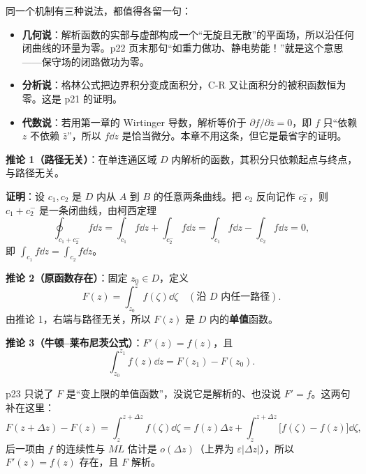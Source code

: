 \documentclass[11pt]{ctexart}
\let\origsubhdr\subhdr
\renewcommand{\subhdr}[1]{\par\needspace{4\baselineskip}\origsubhdr{#1}}
\begin{document}


同一个机制有三种说法，都值得各留一句：

\begin{itemize}
\item \textbf{几何说}：解析函数的实部与虚部构成一个“无旋且无散”的平面场，所以沿任何闭曲线的环量为零。p22 页末那句“如重力做功、静电势能！”就是这个意思——保守场的闭路做功为零。
\item \textbf{分析说}：格林公式把边界积分变成面积分，C-R 又让面积分的被积函数恒为零。这是 p21 的证明。
\item \textbf{代数说}：若用第一章的 Wirtinger 导数，解析等价于 $\partial f/\partial\bar z=0$，即 $f$ 只“依赖 $z$ 不依赖 $\bar z$”，所以 $f\dd z$ 是恰当微分。本章不用这条，但它是最省字的证明。
\end{itemize}


\textbf{推论 1（路径无关）}：在单连通区域 $D$ 内解析的函数，其积分只依赖起点与终点，与路径无关。

\textbf{证明}：设 $c_1,c_2$ 是 $D$ 内从 $A$ 到 $B$ 的任意两条曲线。把 $c_2$ 反向记作 $c_2^{-}$，则 $c_1+c_2^{-}$ 是一条闭曲线，由柯西定理
\[ \oint_{c_1+c_2^{-}}f\dd z=\int_{c_1}f\dd z+\int_{c_2^{-}}f\dd z=\int_{c_1}f\dd z-\int_{c_2}f\dd z=0 , \]
即 $\displaystyle\int_{c_1}f\dd z=\int_{c_2}f\dd z$。

\textbf{推论 2（原函数存在）}：固定 $z_0\in D$，定义
\[ F(z)=\int_{z_0}^{z}f(\zeta)\dd\zeta\quad(\text{沿 }D\text{ 内任一路径}) . \]
由推论 1，右端与路径无关，所以 $F(z)$ 是 $D$ 内的\textbf{单值}函数。

\textbf{推论 3（牛顿--莱布尼茨公式）}：$F'(z)=f(z)$，且
\begin{equation}\label{eq:NL}
\int_{z_0}^{z_1}f(z)\dd z=F(z_1)-F(z_0).
\end{equation}

p23 只说了 $F$ 是“变上限的单值函数”，没说它是解析的、也没说 $F'=f$。这两句补在这里：
\[ F(z+\Delta z)-F(z)=\int_z^{z+\Delta z}f(\zeta)\dd\zeta
=f(z)\Delta z+\int_z^{z+\Delta z}\bigl[f(\zeta)-f(z)\bigr]\dd\zeta , \]
后一项由 $f$ 的连续性与 $ML$ 估计是 $o(\Delta z)$（上界为 $\varepsilon|\Delta z|$），所以 $F'(z)=f(z)$ 存在，且 $F$ 解析。
\end{document}
